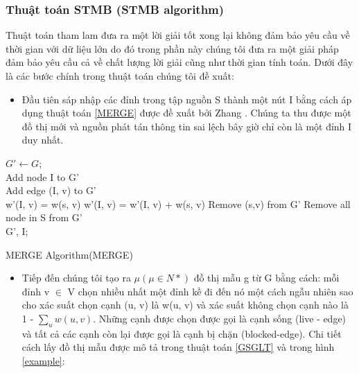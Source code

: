 \subsubsection{Thuật toán STMB (STMB algorithm)}
Thuật toán tham lam đưa ra một lời giải tốt xong lại không đảm bảo yêu cầu về thời gian với dữ liệu lớn do đó trong phần này chúng tôi đưa ra một giải pháp đảm bảo yêu cầu cả về chất lượng lời giải cũng như thời gian tính toán. Dưới đây là các bước chính trong thuật toán chúng tôi đề xuất:
\begin {itemize}
\item Đầu tiên sáp nhập các đỉnh trong tập nguồn S thành một nút I bằng cách áp dụng thuật toán \ref{MERGE} được đề xuất bởi Zhang \cite{yao16}. Chúng ta thu được một đồ thị mới và nguồn phát tán thông tin sai lệch bây giờ chỉ còn là một đỉnh I duy nhất.
\end{itemize}
\begin{algorithm}[H]			
$G' \leftarrow G$;
\\
Add node I to G'			
\\
{
	{
		{
			Add edge (I, v) to G'
			\\
			w'(I, v) = w(s, v)
		}
		{
			w'(I, v) = w'(I, v) + w(s, v)
		}
		Remove (s,v) from G'
	}
}
Remove all node in S from G'
\\
\Return G', I;
\caption{MERGE Algorithm(MERGE)}
\label{MERGE}
\end{algorithm}	
\begin {itemize}			
\item Tiếp đến chúng tôi tạo ra $\mu(\mu \in N*)$ đồ thị mẫu g từ G bằng cách: mỗi đỉnh v $\in$ V chọn nhiều nhất một đỉnh kề đi đến nó một cách ngẫu nhiên sao cho xác suất chọn cạnh (u, v) là w(u, v) và xác suất không chọn cạnh nào là 1 - $\sum_{u} w(u, v)$. Những cạnh được chọn được gọi là cạnh sống  (live - edge) và tất cả các cạnh còn lại được gọi là cạnh bị chặn (blocked-edge). Chi tiết cách lấy đồ thị mẫu được mô tả trong thuật toán \ref{GSGLT} và trong hình \ref{example}: 
\end {itemize}
